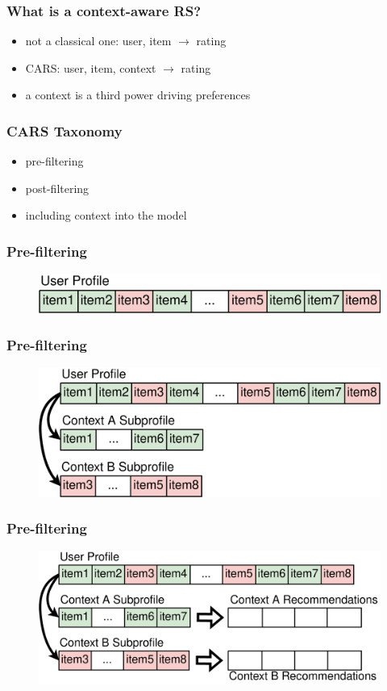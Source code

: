 \documentclass[t]{beamer}
\begin{document}
\begin{frame}
  \frametitle{What is a context-aware RS?}
  \begin{itemize}
  \item not a classical one: user, item $\rightarrow$ rating
  \item CARS: user, item, context $\rightarrow$ rating
  \item a context is a third power driving preferences
  \end{itemize}
\end{frame}
\begin{frame}
  \frametitle{CARS Taxonomy}
  \begin{itemize}
  \item pre-filtering
  \item post-filtering
  \item including context into the model
  \end{itemize}
\end{frame}
\begin{frame}
  \frametitle{Pre-filtering}
\begin{figure}
\includegraphics[scale=0.2]{pre-filtering1}
\end{figure}
\end{frame}
\begin{frame}
  \frametitle{Pre-filtering}
\begin{figure}
\includegraphics[scale=0.2]{pre-filtering2}
\end{figure}
\end{frame}
\begin{frame}
  \frametitle{Pre-filtering}
\begin{figure}
\includegraphics[scale=0.2]{pre-filtering3}
\end{figure}
\end{frame}
\end{document}
